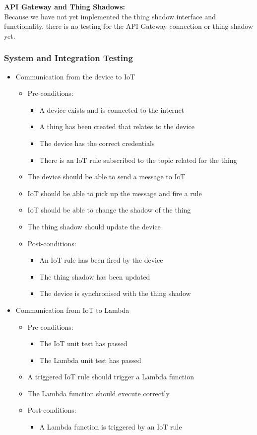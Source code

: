 \documentclass{article}
\begin{document}
			\textbf{API Gateway and Thing Shadows:}
			\\
			Because we have not yet implemented the thing shadow interface and functionality, there is no testing for the API Gateway connection or thing shadow yet.
			
			\subsubsection{System and Integration Testing}
			\begin{itemize}
				\item{Communication from the device to IoT}
					\begin{itemize}
						\item Pre-conditions: 
						\begin{itemize}
							\item A device exists and is connected to the internet
							\item A thing has been created that relates to the device
							\item The device has the correct credentials
							\item There is an IoT rule subscribed to the topic related for the thing
						\end{itemize}
						\item The device should be able to send a message to IoT
						\item IoT should be able to pick up the message and fire a rule
						\item IoT should be able to change the shadow of the thing
						\item The thing shadow should update the device
						\item Post-conditions:
						\begin{itemize}
							\item An IoT rule has been fired by the device
							\item The thing shadow has been updated
							\item The device is synchronised with the thing shadow
						\end{itemize}
					\end{itemize}
				\item{Communication from IoT to Lambda}
				\begin{itemize}
					\item Pre-conditions: 
					\begin{itemize}
						\item The IoT unit test has passed
						\item The Lambda unit test has passed
					\end{itemize}
					\item A triggered IoT rule should trigger a Lambda function
					\item The Lambda function should execute correctly
					\item Post-conditions:
					\begin{itemize}
						\item A Lambda function is triggered by an IoT rule
					\end{itemize}
				\end{itemize}
				

\end{itemize}
\end{document}
